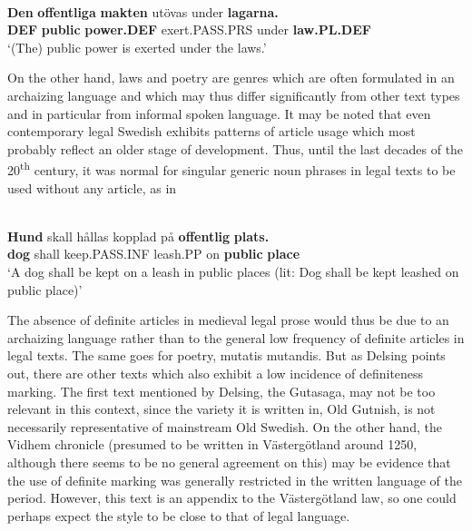 
\ea\label{}
\\
\gll 	\textbf{Den} \textbf{  offentliga} \textbf{  makten} utövas  under  \textbf{lagarna.}\\
		\textbf{DEF} \textbf{public} \textbf{power.DEF} exert.PASS.PRS  under  \textbf{law.PL.DEF}\\
\glt  ‘(The) public power is exerted under the laws.’

\z

On the other hand, laws and poetry are genres which are often formulated in an archaizing language and which may thus differ significantly from other text types and in particular from informal spoken language. It may be noted that even contemporary legal Swedish exhibits patterns of article usage which most probably reflect an older stage of development. Thus, until the last decades of the 20\textsuperscript{th} century, it was normal for singular generic noun phrases in legal texts to be used without any article, as in 


\ea\label{}
\\
\gll	\textbf{Hund} skall  hållas  kopplad  på  \textbf{offentlig} \textbf{  plats.}\\
		\textbf{dog} shall  keep.PASS.INF  leash.PP  on  \textbf{public} \textbf{place}\\
\glt ‘A dog shall be kept on a leash in public places (lit: Dog shall be kept leashed on public place)’

\z

The absence of definite articles in medieval legal prose would thus be due to an archaizing language rather than to the general low frequency of definite articles in legal texts. The same goes for poetry, mutatis mutandis. But as Delsing points out, there are other texts which also exhibit a low incidence of definiteness marking. The first text mentioned by Delsing, the Gutasaga, may not be too relevant in this context, since the variety it is written in, Old Gutnish, is not necessarily representative of mainstream Old Swedish.  On the other hand, the Vidhem chronicle (presumed to be written in Västergötland around 1250, although there seems to be no general agreement on this) may be evidence that the use of definite marking was generally restricted in the written language of the period. However, this text is an appendix to the Västergötland law, so one could perhaps expect the style to be close to that of legal language. 

